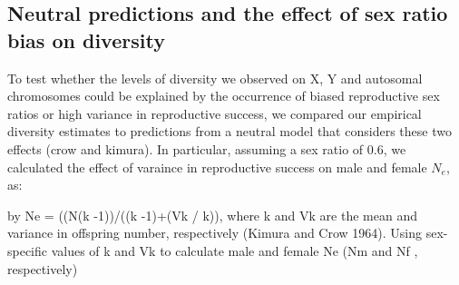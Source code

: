 \documentclass[9pt,twocolumn,twoside]{gsajnl}
\begin{document}

\subsection*{Neutral predictions and the effect of sex ratio bias on diversity}


To test whether the levels of diversity we observed on X, Y and autosomal chromosomes could be explained by the occurrence of biased reproductive sex ratios or high variance in reproductive success, we compared our empirical diversity estimates to predictions from a neutral model that considers these two effects (crow and kimura). In particular, assuming a sex ratio of 0.6, we calculated the effect of varaince in reproductive success on male and female $N_{e}$, as:

by Ne = ((N(k -1))/((k -1)+(Vk / k)), where k and Vk are the mean and variance in offspring number, respectively (Kimura and Crow 1964). Using sex-specific values of k and Vk to calculate male and female Ne (Nm and Nf , respectively)
\end{document}
